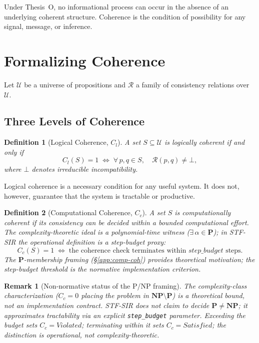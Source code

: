 \documentclass{article}
\newcommand{\Univ}{\mathcal{U}}
\newtheorem{definition}{Definition}
\newtheorem{remark}{Remark}
\begin{document}
Under Thesis~O, no informational process can occur in the absence of an
underlying coherent structure.  Coherence is the condition of possibility for
any signal, message, or inference.

\section{Formalizing Coherence}
\label{sec:coherence}

Let $\Univ$ be a universe of propositions and $\mathcal{R}$ a family of
consistency relations over $\Univ$.

\subsection{Three Levels of Coherence}

\begin{definition}[Logical Coherence, $C_l$]
A set $S \subseteq \Univ$ is \emph{logically coherent} if and only if
\[
  C_l(S) = 1 \;\iff\; \forall\, p, q \in S,\quad \mathcal{R}(p,q) \neq \bot,
\]
where $\bot$ denotes irreducible incompatibility.
\end{definition}

Logical coherence is a necessary condition for any useful system.  It does not,
however, guarantee that the system is tractable or productive.

\begin{definition}[Computational Coherence, $C_c$]
A set $S$ is \emph{computationally coherent} if its consistency can be decided
within a bounded computational effort.  The complexity-theoretic ideal is a
polynomial-time witness ($\exists\,\alpha \in \mathbf{P}$); in STF-SIR the
\emph{operational definition} is a step-budget proxy:
\[
  C_c(S) = 1 \;\iff\; \text{the coherence check terminates within }
  \mathit{step\_budget} \text{ steps}.
\]
The $\mathbf{P}$-membership framing (\S\ref{app:comp-coh}) provides theoretical
motivation; the step-budget threshold is the normative implementation criterion.
\end{definition}

\begin{remark}[Non-normative status of the P/NP framing]
The complexity-class characterization ($C_c = 0$ placing the problem in
$\mathbf{NP} \setminus \mathbf{P}$) is a theoretical bound, not an
implementation contract.  STF-SIR does \emph{not} claim to decide
$\mathbf{P} \neq \mathbf{NP}$; it approximates tractability via an explicit
\texttt{step\_budget} parameter.  Exceeding the budget sets $C_c = \mathit{Violated}$;
terminating within it sets $C_c = \mathit{Satisfied}$; the distinction is
operational, not complexity-theoretic.
\end{remark}
\end{document}
